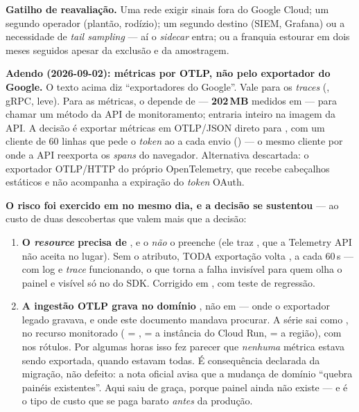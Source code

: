 \textbf{Gatilho de reavaliação.} Uma rede exigir sinais fora do Google
Cloud; um segundo operador (plantão, rodízio); um segundo destino
(SIEM, Grafana) ou a necessidade de \emph{tail sampling} --- aí o
\emph{sidecar} entra; ou a franquia estourar em dois meses seguidos apesar da
exclusão e da amostragem.

\textbf{Adendo (2026-09-02): métricas por OTLP, não pelo exportador do
Google.} O texto acima diz \enquote{exportadores do Google}. Vale para os
\emph{traces} (, gRPC,
leve). Para as métricas, o  depende de
 --- \textbf{202\,MB} medidos em  --- para
chamar um método da API de monitoramento; entraria inteiro na imagem da API.
A decisão é exportar métricas em OTLP/JSON direto para
, com um cliente de 60 linhas que
pede o \emph{token} ao  a cada envio
() --- o mesmo cliente por onde a API
reexporta os \emph{spans} do navegador. Alternativa descartada: o exportador
OTLP/HTTP do próprio OpenTelemetry, que recebe cabeçalhos estáticos e não
acompanha a expiração do \emph{token} OAuth.

\textbf{O risco foi exercido em  no mesmo dia, e a decisão se
sustentou} --- ao custo de duas descobertas que valem mais que a decisão:

\begin{enumerate}
  \item \textbf{O \emph{resource} precisa de }, e o
     \emph{não} o preenche (ele traz ,
    que a Telemetry API não aceita no lugar). Sem o atributo, TODA exportação
    volta , a cada 60\,s
    --- com log e \emph{trace} funcionando, o que torna a falha invisível para
    quem olha o painel e visível só no  do SDK. Corrigido em
    , com teste de regressão.
  \item \textbf{A ingestão OTLP grava no domínio
    }, não em  ---
    onde o exportador legado gravava, e onde este documento mandava procurar.
    A série sai como
    ,
    no recurso monitorado  ( =
    ,  = a instância do Cloud Run,
     = a região), com  nos rótulos. Por
    algumas horas isso fez parecer que \emph{nenhuma} métrica estava sendo
    exportada, quando estavam todas. É consequência declarada da migração, não
    defeito: a nota oficial avisa que a mudança de domínio \enquote{quebra
    painéis existentes}. Aqui saiu de graça, porque painel ainda não existe ---
    e é o tipo de custo que se paga barato \emph{antes} da produção.
\end{enumerate}

